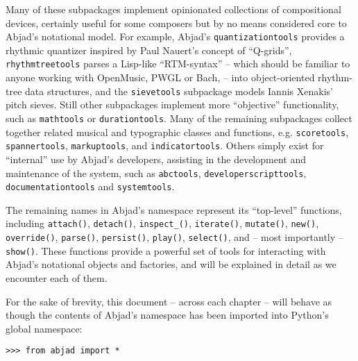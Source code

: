 \noindent Many of these subpackages implement opinionated collections of
compositional devices, certainly useful for some composers but by no means
considered core to Abjad's notational model. For example, Abjad's
\texttt{quantizationtools} provides a rhythmic quantizer inspired by Paul
Nauert's concept of \enquote{Q-grids}\cite{nauert1997timespan},
\texttt{rhythmtreetools} parses a Lisp-like \enquote{RTM-syntax} -- which
should be familiar to anyone working with OpenMusic\cite{assayag1999sw},
PWGL\cite{laurson2009qf, kuuskankare2004recent} or Bach\cite{agostini2013real},
-- into object-oriented rhythm-tree data structures, and the
\texttt{sievetools} subpackage models Iannis Xenakis' pitch
sieves\cite{xenakis1992formalized}. Still other subpackages implement more
\enquote{objective} functionality, such as \texttt{mathtools} or
\texttt{durationtools}. Many of the remaining subpackages collect together
related musical and typographic classes and functions, e.g.
\texttt{scoretools}, \texttt{spannertools}, \texttt{markuptools}, and
\texttt{indicatortools}. Others simply exist for \enquote{internal} use by
Abjad's developers, assisting in the development and maintenance of the system,
such as \texttt{abctools}, \texttt{developerscripttools},
\texttt{documentationtools} and \texttt{systemtools}.

The remaining names in Abjad's namespace represent its \enquote{top-level}
functions, including \texttt{attach()}, \texttt{detach()},
\texttt{inspect\_()}, \texttt{iterate()}, \texttt{mutate()}, \texttt{new()},
\texttt{override()}, \texttt{parse()}, \texttt{persist()}, \texttt{play()},
\texttt{select()}, and -- most importantly --
\texttt{show()}. These functions provide a powerful set of tools for
interacting with Abjad's notational objects and factories, and will be
explained in detail as we encounter each of them.

For the sake of brevity, this document -- across each chapter -- will behave as
though the contents of Abjad's namespace has been imported into Python's global
namespace:

\begin{comment}
<abjad>
from abjad import *
</abjad>
\end{comment}

\begin{abjadbookoutput}
\begin{singlespacing}
\vspace{-0.5\baselineskip}
\begin{verbatim}
>>> from abjad import *
\end{verbatim}
\end{singlespacing}
\end{abjadbookoutput}

